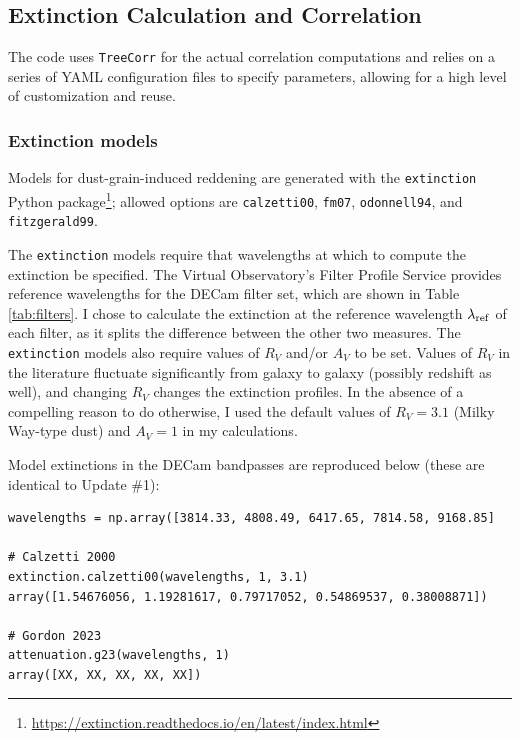 \documentclass[11pt, oneside]{article}   	%
\begin{document}

\subsection{Extinction Calculation and Correlation}\label{sec:code:analysis}

The code uses \texttt{TreeCorr} for the actual correlation computations and relies on a series of YAML configuration files to specify parameters, allowing for a high level of customization and reuse.

\subsubsection{Extinction models}
Models for dust-grain-induced reddening are generated with the \texttt{extinction} Python package\footnote{\url{https://extinction.readthedocs.io/en/latest/index.html}}; allowed options are \texttt{calzetti00}, \texttt{fm07}, \texttt{odonnell94}, and \texttt{fitzgerald99}. 

The \texttt{extinction} models require that wavelengths at which to compute the extinction be specified. The Virtual Observatory's Filter Profile Service provides reference wavelengths for the DECam filter set, which are shown in Table \ref{tab:filters}. I chose to calculate the extinction at the reference wavelength $\lambda_{\rm ref}$ of each filter, as it splits the difference between the other two measures. The \texttt{extinction} models also require values of $R_V$ and/or $A_V$ to be set. Values of $R_V$ in the literature fluctuate significantly from galaxy to galaxy (possibly redshift as well), and changing $R_V$ changes the extinction profiles. In the absence of a compelling reason to do otherwise, I used the default values of $R_V = 3.1$ (Milky Way-type dust) and $A_V = 1$ in my calculations. 

Model extinctions in the DECam bandpasses are reproduced below (these are identical to Update \#1): 
\small
\begin{verbatim}
wavelengths = np.array([3814.33, 4808.49, 6417.65, 7814.58, 9168.85]

# Calzetti 2000
extinction.calzetti00(wavelengths, 1, 3.1)
array([1.54676056, 1.19281617, 0.79717052, 0.54869537, 0.38008871])

# Gordon 2023
attenuation.g23(wavelengths, 1)
array([XX, XX, XX, XX, XX])

\end{verbatim}
\end{document}
